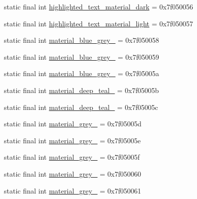 \begin{DoxyCompactItemize}
\item 
static final int \mbox{\hyperlink{classandroid_1_1support_1_1design_1_1R_1_1color_a6ab9e4175ec63197d0900ba09a0f97ea}{highlighted\+\_\+text\+\_\+material\+\_\+dark}} = 0x7f050056
\item 
static final int \mbox{\hyperlink{classandroid_1_1support_1_1design_1_1R_1_1color_ac907c1357540e315526c5cbcf77e1c8b}{highlighted\+\_\+text\+\_\+material\+\_\+light}} = 0x7f050057
\item 
static final int \mbox{\hyperlink{classandroid_1_1support_1_1design_1_1R_1_1color_a94ad9c11ec4c2f4f4363086c0912cc02}{material\+\_\+blue\+\_\+grey\+\_}} = 0x7f050058
\item 
static final int \mbox{\hyperlink{classandroid_1_1support_1_1design_1_1R_1_1color_a46a38525b5abce02d2af2b0952a03acb}{material\+\_\+blue\+\_\+grey\+\_}} = 0x7f050059
\item 
static final int \mbox{\hyperlink{classandroid_1_1support_1_1design_1_1R_1_1color_a4ffe46d495ab57f7786eb9a71332a046}{material\+\_\+blue\+\_\+grey\+\_}} = 0x7f05005a
\item 
static final int \mbox{\hyperlink{classandroid_1_1support_1_1design_1_1R_1_1color_a2327adad97cad903af16d58929baff0a}{material\+\_\+deep\+\_\+teal\+\_}} = 0x7f05005b
\item 
static final int \mbox{\hyperlink{classandroid_1_1support_1_1design_1_1R_1_1color_aa324b4dbc847bbffae73fe41c72d6196}{material\+\_\+deep\+\_\+teal\+\_}} = 0x7f05005c
\item 
static final int \mbox{\hyperlink{classandroid_1_1support_1_1design_1_1R_1_1color_a2a0f568154bdaa62d15bf34a00c304ad}{material\+\_\+grey\+\_}} = 0x7f05005d
\item 
static final int \mbox{\hyperlink{classandroid_1_1support_1_1design_1_1R_1_1color_a1705b753106c00c13828ca1244c48efc}{material\+\_\+grey\+\_}} = 0x7f05005e
\item 
static final int \mbox{\hyperlink{classandroid_1_1support_1_1design_1_1R_1_1color_a14fe6537794cbcbbc8d4a37c47aee322}{material\+\_\+grey\+\_}} = 0x7f05005f
\item 
static final int \mbox{\hyperlink{classandroid_1_1support_1_1design_1_1R_1_1color_a57555e23bbe3cc7c4f9c5f77592cfbf1}{material\+\_\+grey\+\_}} = 0x7f050060
\item 
static final int \mbox{\hyperlink{classandroid_1_1support_1_1design_1_1R_1_1color_ad9a2b51d092cb75f6962ac361e97d011}{material\+\_\+grey\+\_}} = 0x7f050061
\item 

\end{DoxyCompactItemize}
